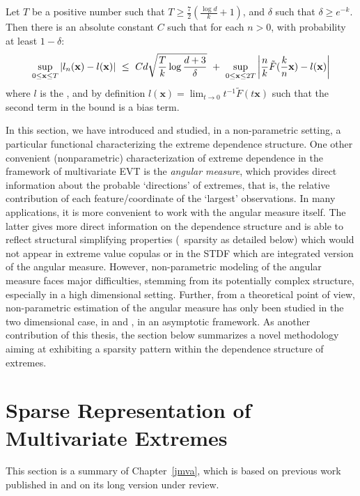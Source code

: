 \begin{theorem}
\label{thm:l}
Let $T$ be a positive number such that $T \ge \frac{7}{2}(\frac{\log d}{k} + 1)$, and $\delta$ such that $\delta \ge e^{-k}$. Then there is an absolute constant $C$ such that for each $n >0$, with probability at least $1-\delta$:
\begin{align*}
\sup_{0 \le \mathbf{x} \le T} \left| l_n(\mathbf{x}) - l(\mathbf{x})
\right| ~\le~ Cd\sqrt{\frac{T}{k}\log\frac{d+3}{\delta}} ~+~ \sup_{0
  \le \mathbf{x} \le 2T}\left|\frac{n}{k} \tilde
  F(\frac{k}{n}\mathbf{x})- %
l(\mb x)\right|
\end{align*}
where $l$ is the \stdf, and by definition $l(\mathbf{x})= \lim_{t \to 0} t^{-1} \tilde F (t\mathbf{x}) $ such that the second term in the bound is a bias term.
\end{theorem}


In this section, we have introduced and studied, in a non-parametric setting, a particular functional characterizing the extreme dependence structure.
%
One other convenient (nonparametric) characterization of  extreme dependence in the framework of multivariate EVT is the \textit{angular measure}, which provides direct information about the probable `directions' of extremes, that is, the relative contribution of each feature/coordinate of the `largest' observations.
%
In many applications, it is more convenient to work with the angular measure itself. The latter gives more direct information on the dependence structure and is able to reflect structural simplifying properties (\eg~sparsity as detailed below) which would not appear in extreme value copulas or in the STDF which are integrated version of the angular measure.
However, non-parametric modeling of the angular measure faces major difficulties, stemming from its potentially complex structure, especially in a high dimensional setting.
Further, from a theoretical point of view, non-parametric estimation of the angular measure has only been studied in the two dimensional case, in \cite{Einmahl2001} and \cite{Einmahl2009}, in an asymptotic framework. As another contribution of this thesis, the section below summarizes a novel methodology %
aiming at exhibiting a sparsity pattern within the dependence structure of extremes.



\section{Sparse Representation of Multivariate Extremes}
\label{resume:sec:JMVA}
This section is a summary of Chapter~\ref{jmva}, which is based on previous work published in \cite{AISTAT16} and on its long version \cite{ARXIV16} under review.

